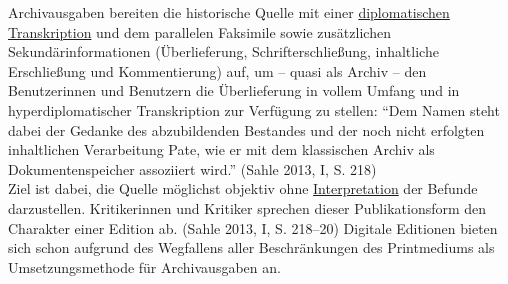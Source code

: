 \documentclass{article}
\begin{document}
    Archivausgaben bereiten die historische Quelle mit einer \href{http://gams.uni-graz.at/o:konde.66}{diplomatischen Transkription} und dem parallelen Faksimile sowie zusätzlichen Sekundärinformationen (Überlieferung, Schrifterschließung, inhaltliche Erschließung und Kommentierung) auf, um – quasi als Archiv – den Benutzerinnen und Benutzern die Überlieferung in vollem Umfang und in hyperdiplomatischer Transkription zur Verfügung zu stellen: “Dem Namen steht dabei der Gedanke des abzubildenden Bestandes und der noch nicht erfolgten inhaltlichen Verarbeitung Pate, wie er mit dem klassischen Archiv als Dokumentenspeicher assoziiert wird.” (Sahle 2013, I, S. 218)\\
            
        Ziel ist dabei, die Quelle möglichst objektiv ohne \href{http://gams.uni-graz.at/o:konde.100}{Interpretation} der Befunde darzustellen. Kritikerinnen und Kritiker sprechen dieser Publikationsform den Charakter einer Edition ab. (Sahle 2013, I, S. 218–20) Digitale Editionen bieten sich schon aufgrund des Wegfallens aller Beschränkungen des Printmediums als Umsetzungsmethode für Archivausgaben an.\\
            
\end{document}
